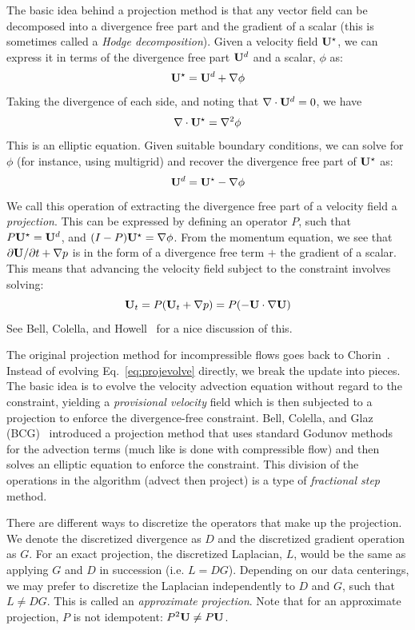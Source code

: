 The basic idea behind a projection method is that any vector field
can be decomposed into a divergence free part and the gradient of 
a scalar (this is sometimes called a {\em Hodge decomposition}).  
Given a velocity field ${\bf U}^\star$, we can express it in terms of the 
divergence free part ${\bf U}^d$ and a scalar, $\phi$ as:
\begin{equation}
{\bf U}^\star = {\bf U}^d + \nabla \phi
\end{equation}
Taking the divergence of each side, and noting that $\nabla \cdot {\bf U}^d
= 0$, we have
\begin{equation}
\nabla \cdot {\bf U}^\star = \nabla^2 \phi
\end{equation}
This is an elliptic equation.  Given suitable boundary conditions, we
can solve for $\phi$ (for instance, using multigrid) and recover the
divergence free part of ${\bf U}^\star$ as:
\begin{equation}
{\bf U}^d = {\bf U}^\star - \nabla \phi
\end{equation}
We call this operation of extracting the divergence free part of a
velocity field a {\em projection}.  This can be expressed by defining
an operator $P$, such that $P{\bf U}^\star = {\bf U}^d$, and $(I - P){\bf U}^\star =
\nabla \phi$.  From the momentum equation, we see that $\partial
{\bf U}/\partial t + \nabla p$ is in the form of a divergence free term
$+$ the gradient of a scalar.  This means that advancing the velocity
field subject to the constraint involves solving:
\begin{equation}
{\bf U}_t = P({\bf U}_t + \nabla p) = P(-{\bf U}\cdot \nabla {\bf U})
\label{eq:projevolve}
\end{equation}
See Bell, Colella, and Howell~\cite{BCH} for a nice discussion of this.

The original projection method for incompressible flows goes back to
Chorin~\cite{chorin:1968}.  Instead of evolving
Eq.~\ref{eq:projevolve} directly, we break the update into pieces.
The basic idea is to evolve the velocity advection equation without
regard to the constraint, yielding a {\em provisional velocity} field
which is then subjected to a projection to enforce the divergence-free
constraint.  Bell, Colella, and Glaz (BCG)~\cite{BCG} introduced a projection
method that uses standard Godunov methods for the advection terms
(much like is done with compressible flow) and then solves an elliptic
equation to enforce the constraint.  This division of the operations
in the algorithm (advect then project) is a type of {\em fractional
  step} method.

There are different ways to discretize the operators that make up the
projection.  We denote the discretized divergence as $D$ and the
discretized gradient operation as $G$.  For an exact projection, the
discretized Laplacian, $L$, would be the same as applying $G$ and $D$
in succession (i.e. $L = DG$).  Depending on our data centerings, we
may prefer to discretize the Laplacian independently to $D$ and $G$,
such that $L \ne DG$.  This is called an {\em approximate projection}.
Note that for an approximate projection, $P$ is not
idempotent: $P^2 {\bf U} \ne P{\bf U}$.

